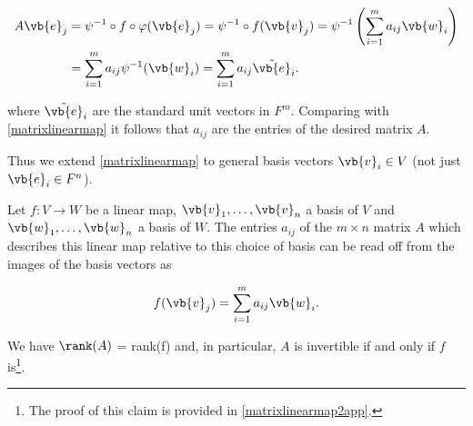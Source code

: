 \documentclass[a4paper,12pt]{report}
\begin{document}
\begin{equation}  
    \begin{aligned}
    A\vb{e} _{j} &= \psi ^{-1} \circ f \circ \varphi (\vb{e} _{j} ) =\psi ^{-1} \circ f(\vb{v} _{j} ) = \psi ^{-1} \left( \sum_{i=1}^{m} a_{ij}\vb{w} _{i}   \right) \\ &= \sum_{i=1}^{m} a_{ij} \psi ^{-1} (\vb{w} _{i} ) = \sum_{i=1}^{m} a_{ij}\tilde{\vb{e} }_{i}.     
    \end{aligned}
\end{equation}

where \(\tilde{\vb{e} }_{i}  \) are the standard unit vectors in \(F^{m} \). Comparing with \cref{matrixlinearmap} it follows that \(a_{ij} \) are the entries of the desired matrix \(A\).

Thus we extend \cref{matrixlinearmap} to general basis vectors \(\vb{v}_{i}  \in  V\) (not just \(\vb{e} _{i} \in F^{n}\)).   

\begin{lemma} \label{matrixlinearmap2} 
Let \(f:V \rightarrow W\) be a linear map, \(\vb{v}_{1}, \ldots, \vb{v}_n \) a basis of \(V\) and \(\vb{w}_{1}, \ldots, \vb{w}_n \) a basis of \(W\). The entries \(a_{ij} \) of the \(m \times n\) matrix \(A\) which describes this linear map relative to this choice of basis can be read off from the images of the basis vectors as 

\begin{equation}
    f(\vb{v} _{j} ) = \sum_{i=1}^{m} a_{ij}\vb{w} _{i} . 
\end{equation}

We have \(\rank (A)\) = rank(f) and, in particular, \(A\) is invertible if and only if \(f\) is\footnote{The proof of this claim is provided in \cref{matrixlinearmap2app}.}.  

\end{lemma}
\end{document}
